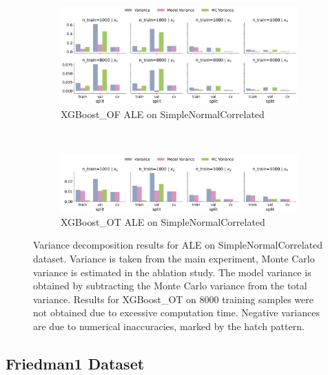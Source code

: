 \documentclass[runningheads]{llncs}
\begin{document}
\begin{figure}[htbp]
    \centering
    \begin{subfigure}[b]{0.75\textwidth}
        \includegraphics[width=\textwidth]{img/SNC-all/variance_decomposition_ale_XGBoost_OF.png}
        \caption{XGBoost\_OF ALE on SimpleNormalCorrelated}
    \end{subfigure}
    \\[10pt]
    \vfill
    \begin{subfigure}[b]{0.75\textwidth}
        \includegraphics[width=\textwidth]{img/SNC-all/variance_decomposition_ale_XGBoost_OT.png}
        \caption{XGBoost\_OT ALE on SimpleNormalCorrelated}
    \end{subfigure}
    \caption{Variance decomposition results for ALE on SimpleNormalCorrelated dataset. Variance is taken from the
        main experiment, Monte Carlo variance is estimated in the ablation study. The model variance is
        obtained by subtracting the Monte Carlo variance from the total variance. Results for XGBoost\_OT
        on 8000 training samples were not obtained due to excessive computation time. Negative variances are
        due to numerical inaccuracies, marked by the hatch pattern.}
    \label{fig:ale-variance-decomp-snc}  %
\end{figure}

\clearpage
\subsection{Friedman1 Dataset}
\end{document}
